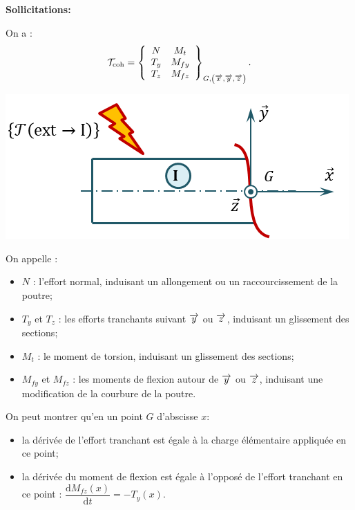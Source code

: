 \documentclass[10pt,fleqn]{article} %
\begin{document}
\begin{defi}
\textbf{Sollicitations:} ~\\

\begin{minipage}[c]{.65\linewidth}
On a : 
$$
\mathcal{T}_{\text{coh}} = \torseurcol{N}{T_y}{T_z}{M_t}{M_{fy}}{M_{fz}}{G,\left(\vx{}, \vy{}, \vz{} \right)}.
$$
\end{minipage} \hfill
\begin{minipage}[c]{.3\linewidth}
\begin{center}
\includegraphics[width=\linewidth]{images/sollicitations}
\end{center}
\end{minipage}

On appelle :
\begin{itemize}
\item $N$ : l'effort normal, induisant un allongement ou un raccourcissement de la poutre;
\item $T_y$ et $T_z$ : les efforts tranchants suivant $\vy{}$ ou $\vz{}$, induisant un glissement des sections;
\item $M_{t}$ : le moment de torsion, induisant un glissement des sections; 
\item $M_{fy}$ et $M_{fz}$ : les moments de flexion autour de $\vy{}$ ou $\vz{}$, induisant une modification de la courbure de la poutre.
\end{itemize}

\end{defi}


\begin{rem}
On peut montrer qu'en un point $G$ d'abscisse $x$:
\begin{itemize}
\item la dérivée de l'effort tranchant est égale à la charge élémentaire appliquée en ce point;
\item la dérivée du moment de flexion est égale à l'opposé de l'effort tranchant en ce point : $\dfrac{\text{d}M_{fz}(x)}{\text{d}t}=-T_y(x)$.
\end{itemize}
\end{rem}
\end{document}
